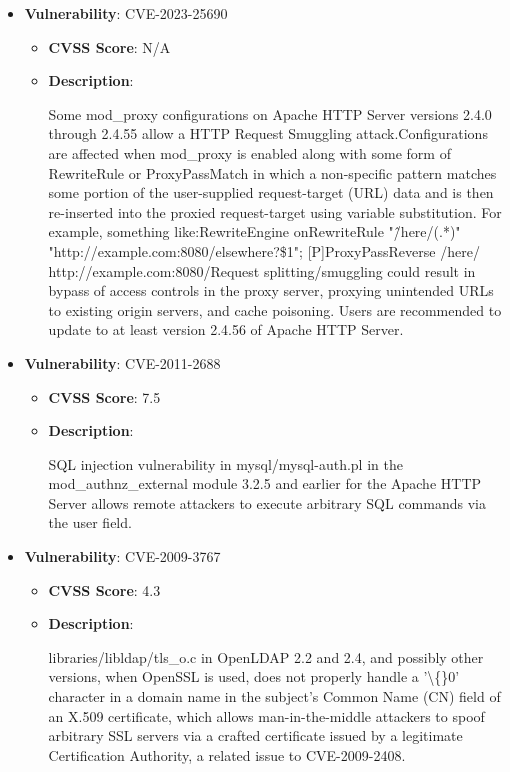 \documentclass{article}
\begin{document}
\begin{itemize}
        \item \textbf{Vulnerability}: CVE-2023-25690
        \begin{itemize}
            \item \textbf{CVSS Score}:  N/A 
            \item \textbf{Description}:
            \parbox[t]{0.9\linewidth}{
                \ttfamily Some mod\_proxy configurations on Apache HTTP Server versions 2.4.0 through 2.4.55 allow a HTTP Request Smuggling attack.Configurations are affected when mod\_proxy is enabled along with some form of RewriteRule or ProxyPassMatch in which a non-specific pattern matches some portion of the user-supplied request-target (URL) data and is then re-inserted into the proxied request-target using variable substitution. For example, something like:RewriteEngine onRewriteRule "\^/here/(.*)" "http://example.com:8080/elsewhere?\$1"; [P]ProxyPassReverse /here/ http://example.com:8080/Request splitting/smuggling could result in bypass of access controls in the proxy server, proxying unintended URLs to existing origin servers, and cache poisoning. Users are recommended to update to at least version 2.4.56 of Apache HTTP Server.
            }
        \end{itemize}
    
        \item \textbf{Vulnerability}: CVE-2011-2688
        \begin{itemize}
            \item \textbf{CVSS Score}:  7.5 
            \item \textbf{Description}:
            \parbox[t]{0.9\linewidth}{
                \ttfamily SQL injection vulnerability in mysql/mysql-auth.pl in the mod\_authnz\_external module 3.2.5 and earlier for the Apache HTTP Server allows remote attackers to execute arbitrary SQL commands via the user field.
            }
        \end{itemize}
    
        \item \textbf{Vulnerability}: CVE-2009-3767
        \begin{itemize}
            \item \textbf{CVSS Score}:  4.3 
            \item \textbf{Description}:
            \parbox[t]{0.9\linewidth}{
                \ttfamily libraries/libldap/tls\_o.c in OpenLDAP 2.2 and 2.4, and possibly other versions, when OpenSSL is used, does not properly handle a '\textbackslash\{\}0' character in a domain name in the subject's Common Name (CN) field of an X.509 certificate, which allows man-in-the-middle attackers to spoof arbitrary SSL servers via a crafted certificate issued by a legitimate Certification Authority, a related issue to CVE-2009-2408.
            }
        \end{itemize}
    

\end{itemize}
\end{document}
